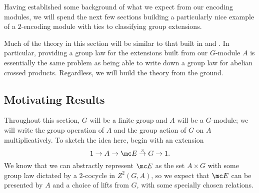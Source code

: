 
Having established some background of what we expect from our encoding modules, we will spend the next few sections building a particularly nice example of a $2$-encoding module with ties to classifying group extensions.

Much of the theory in this section will be similar to that built in \cite{abelian-crossed} and \cite{cohom-abelian-crossed}. In particular, providing a group law for the extensions built from our $G$-module $A$ is essentially the same problem as being able to write down a group law for abelian crossed products. Regardless, we will build the theory from the ground.

\subsection{Motivating Results} \label{sec:singlevar}
Throughout this section, $ G$ will be a finite group and $A$ will be a $ G$-module; we will write the group operation of $A$ and the group action of $ G$ on $A$ multiplicatively. To sketch the idea here, begin with an extension
\[1\to A\to\mc E\stackrel\pi\to G\to1.\]
We know that we can abstractly represent $\mc E$ as the set $A\times G$ with some group law dictated by a $2$-cocycle in $Z^2(G,A)$, so we expect that $\mc E$ can be presented by $A$ and a choice of lifts from $ G$, with some specially chosen relations.

